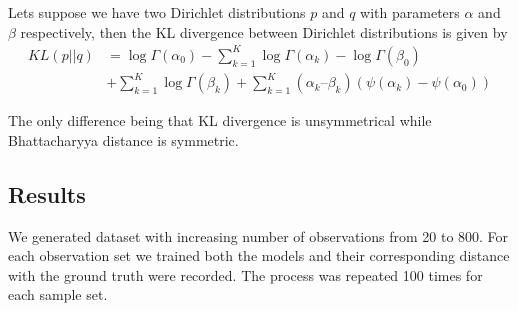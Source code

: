 Lets suppose we have two Dirichlet distributions $p$ and $q$ with parameters $\alpha$ and $\beta$ respectively, then the KL divergence between Dirichlet distributions\cite{kurt2013} is given by
\begin{equation*}
	\begin{split} 
 KL (p||q) &= \log \Gamma (\alpha_0) - \sum_{k=1}^K \log \Gamma (\alpha_k)   
 - \log \Gamma (\beta_0) \\ &+ \sum_{k=1}^K \log \Gamma (\beta_k)  + \sum_{k=1}^K  (\alpha_k – \beta_k)  (\psi (\alpha_k)-\psi (\alpha_0)) 
\end{split}
\end{equation*}


The only difference being that KL divergence is unsymmetrical while Bhattacharyya distance is symmetric. 

\subsection{Results}
We generated dataset with increasing number of observations from 20 to 800. For each observation set we trained both the models and their corresponding distance with the ground truth were recorded. The process was repeated 100 times for each sample set.

